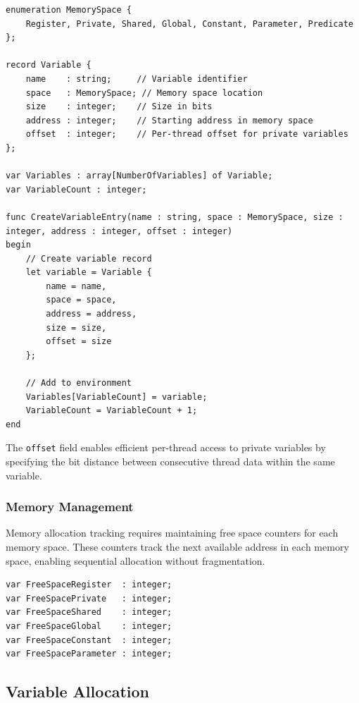 \begin{lstlisting}[caption={Variable Definition and Environment}, label={lst:variable_definition}]
enumeration MemorySpace { 
    Register, Private, Shared, Global, Constant, Parameter, Predicate 
};

record Variable {
    name    : string;     // Variable identifier
    space   : MemorySpace; // Memory space location
    size    : integer;    // Size in bits
    address : integer;    // Starting address in memory space
    offset  : integer;    // Per-thread offset for private variables
};

var Variables : array[NumberOfVariables] of Variable;
var VariableCount : integer;

func CreateVariableEntry(name : string, space : MemorySpace, size : integer, address : integer, offset : integer)
begin
    // Create variable record
    let variable = Variable {
        name = name,
        space = space,
        address = address,
        size = size,
        offset = size
    };

    // Add to environment
    Variables[VariableCount] = variable;
    VariableCount = VariableCount + 1;
end

\end{lstlisting}

The \texttt{offset} field enables efficient per-thread access to private
variables by specifying the bit distance between consecutive thread data within
the same variable.

\subsubsection{Memory Management}
Memory allocation tracking requires maintaining free space counters for each
memory space. These counters track the next available address in each memory
space, enabling sequential allocation without fragmentation.

\begin{lstlisting}[caption={Memory Allocation State}, label={lst:memory_state}]
var FreeSpaceRegister  : integer;
var FreeSpacePrivate   : integer;
var FreeSpaceShared    : integer;
var FreeSpaceGlobal    : integer;
var FreeSpaceConstant  : integer;
var FreeSpaceParameter : integer;
\end{lstlisting}

\subsection{Variable Allocation}
\label{subsec:variable_allocation}


